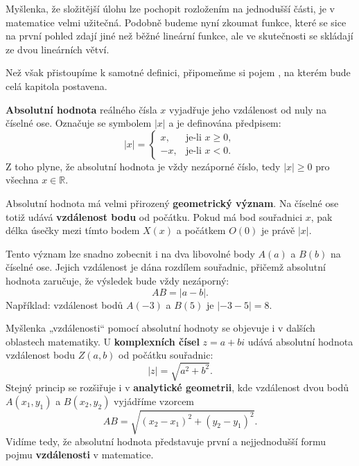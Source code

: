 \documentclass[12pt,a4paper]{article}
\begin{document}
Myšlenka, že složitější úlohu lze pochopit rozložením na jednodušší části,
je v matematice velmi užitečná.  
Podobně budeme nyní zkoumat funkce, 
které se sice na první pohled zdají jiné než běžné lineární funkce, 
ale ve skutečnosti se skládají ze dvou lineárních větví.

Než však přistoupíme k samotné definici, připomeňme si pojem , na kterém bude celá kapitola postavena.

\begin{definitionbox}
\textbf{Absolutní hodnota} reálného čísla $x$ vyjadřuje jeho vzdálenost od nuly na číselné ose.  
Označuje se symbolem $|x|$ a je definována předpisem:
\[
|x| =
\begin{cases}
x, & \text{je-li } x \ge 0,\\[4pt]
-x, & \text{je-li } x < 0.
\end{cases}
\]
Z toho plyne, že absolutní hodnota je vždy nezáporné číslo,
 tedy $|x| \ge 0$ pro všechna $x \in \mathbb{R}$.
\end{definitionbox}


Absolutní hodnota má velmi přirozený \textbf{geometrický význam}.  
Na číselné ose totiž udává \textbf{vzdálenost bodu} od počátku.  
Pokud má bod souřadnici $x$, pak délka úsečky mezi tímto bodem $X(x)$ a počátkem $O(0)$ je právě $|x|$.  

\begin{center}
\end{center}

Tento význam lze snadno zobecnit i na dva libovolné body $A(a)$ a $B(b)$ na číselné ose.  
Jejich vzdálenost je dána rozdílem souřadnic, přičemž absolutní hodnota zaručuje,  
že výsledek bude vždy nezáporný:
\[
AB = |a - b|.
\]
Například: vzdálenost bodů $A(-3)$ a $B(5)$ je $|{-3}-5| = 8$.

Myšlenka „vzdálenosti“ pomocí absolutní hodnoty se objevuje i v dalších oblastech matematiky.  
U \textbf{komplexních čísel} $z = a + bi$ udává absolutní hodnota vzdálenost bodu $Z(a,b)$ od počátku souřadnic:
\[
|z| = \sqrt{a^2 + b^2}.
\]
Stejný princip se rozšiřuje i v \textbf{analytické geometrii},  
kde vzdálenost dvou bodů $A(x_1, y_1)$ a $B(x_2, y_2)$ vyjádříme vzorcem
\[
AB = \sqrt{(x_2 - x_1)^2 + (y_2 - y_1)^2}.
\]
Vidíme tedy, že absolutní hodnota představuje první a nejjednodušší formu pojmu \textbf{vzdálenosti} v matematice.
\end{document}
